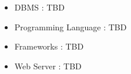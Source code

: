   \begin{itemize}
    \item DBMS : TBD
    \item Programming Language : TBD
    \item Frameworks : TBD
    \item Web Server : TBD
  \end{itemize}
